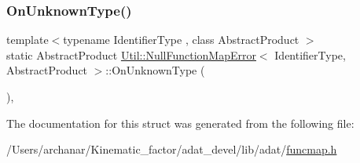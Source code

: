 \mbox{\label{structUtil_1_1NullFunctionMapError_afde570791232ed1469bcba0fdffcd8c8}} 
\subsubsection{\texorpdfstring{OnUnknownType()}{OnUnknownType()}\hspace{0.1cm}{\footnotesize\ttfamily [2/2]}}
{\footnotesize\ttfamily template$<$typename Identifier\+Type , class Abstract\+Product $>$ \\
static Abstract\+Product \mbox{\hyperlink{structUtil_1_1NullFunctionMapError}{Util\+::\+Null\+Function\+Map\+Error}}$<$ Identifier\+Type, Abstract\+Product $>$\+::On\+Unknown\+Type (\begin{DoxyParamCaption}\item[{const Identifier\+Type \&}]{ }\end{DoxyParamCaption})\hspace{0.3cm}{\ttfamily [inline]}, {\ttfamily [static]}}



The documentation for this struct was generated from the following file\+:\begin{DoxyCompactItemize}
\item 
/\+Users/archanar/\+Kinematic\+\_\+factor/adat\+\_\+devel/lib/adat/\mbox{\hyperlink{lib_2adat_2funcmap_8h}{funcmap.\+h}}\end{DoxyCompactItemize}
